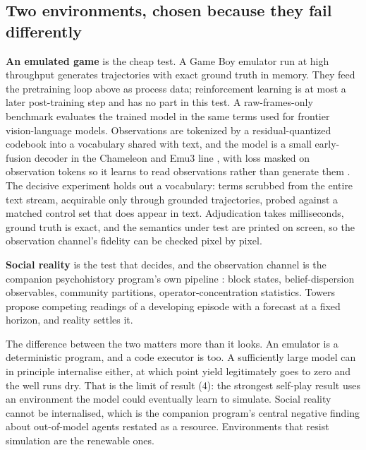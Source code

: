 \documentclass[11pt]{article}
\begin{document}
\subsection{Two environments, chosen because they fail differently}

\textbf{An emulated game} is the cheap test. A Game Boy emulator run at high throughput \cite{suarez2024pufferlib} generates trajectories with exact ground truth in memory. They feed the pretraining loop above as process data; reinforcement learning is at most a later post-training step and has no part in this test. A raw-frames-only benchmark \cite{zhang2025vgb} evaluates the trained model in the same terms used for frontier vision-language models. Observations are tokenized by a residual-quantized codebook into a vocabulary shared with text, and the model is a small early-fusion decoder in the Chameleon and Emu3 line \cite{chameleon2024,emu3nature2025}, with loss masked on observation tokens so it learns to read observations rather than generate them \cite{paligemma2024}. The decisive experiment holds out a vocabulary: terms scrubbed from the entire text stream, acquirable only through grounded trajectories, probed against a matched control set that does appear in text. Adjudication takes milliseconds, ground truth is exact, and the semantics under test are printed on screen, so the observation channel's fidelity can be checked pixel by pixel.

\textbf{Social reality} is the test that decides, and the observation channel is the companion psychohistory program's own pipeline \cite{sharon2026psychohistory}: block states, belief-dispersion observables, community partitions, operator-concentration statistics. Towers propose competing readings of a developing episode with a forecast at a fixed horizon, and reality settles it.

The difference between the two matters more than it looks. An emulator is a deterministic program, and a code executor is too. A sufficiently large model can in principle internalise either, at which point yield legitimately goes to zero and the well runs dry. That is the limit of result (4): the strongest self-play result uses an environment the model could eventually learn to simulate. Social reality cannot be internalised, which is the companion program's central negative finding about out-of-model agents restated as a resource. Environments that resist simulation are the renewable ones.
\end{document}
